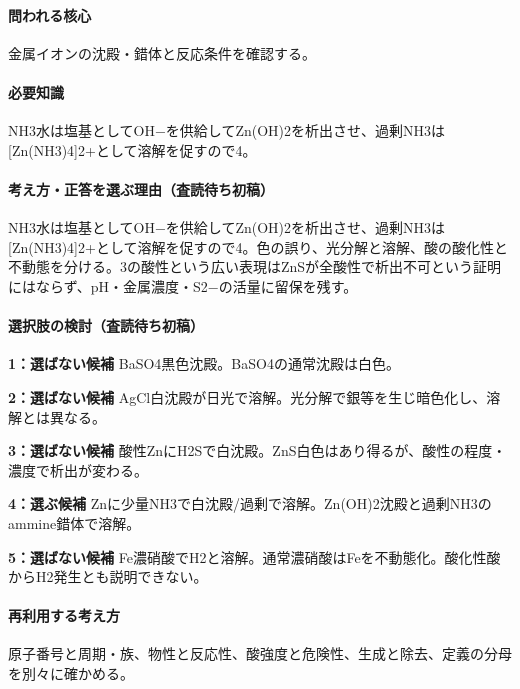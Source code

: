 \paragraph{問われる核心} 金属イオンの沈殿・錯体と反応条件を確認する。

\paragraph{必要知識} NH3水は塩基としてOH−を供給してZn(OH)2を析出させ、過剰NH3は[Zn(NH3)4]2+として溶解を促すので4。

\paragraph{考え方・正答を選ぶ理由（査読待ち初稿）} NH3水は塩基としてOH−を供給してZn(OH)2を析出させ、過剰NH3は[Zn(NH3)4]2+として溶解を促すので4。色の誤り、光分解と溶解、酸の酸化性と不動態を分ける。3の酸性という広い表現はZnSが全酸性で析出不可という証明にはならず、pH・金属濃度・S2−の活量に留保を残す。

\paragraph{選択肢の検討（査読待ち初稿）}\mbox{}\par

\noindent\textbf{1：選ばない候補} BaSO4黒色沈殿。BaSO4の通常沈殿は白色。\par

\noindent\textbf{2：選ばない候補} AgCl白沈殿が日光で溶解。光分解で銀等を生じ暗色化し、溶解とは異なる。\par

\noindent\textbf{3：選ばない候補} 酸性ZnにH2Sで白沈殿。ZnS白色はあり得るが、酸性の程度・濃度で析出が変わる。\par

\noindent\textbf{4：選ぶ候補} Znに少量NH3で白沈殿/過剰で溶解。Zn(OH)2沈殿と過剰NH3のammine錯体で溶解。\par

\noindent\textbf{5：選ばない候補} Fe濃硝酸でH2と溶解。通常濃硝酸はFeを不動態化。酸化性酸からH2発生とも説明できない。\par

\paragraph{再利用する考え方} 原子番号と周期・族、物性と反応性、酸強度と危険性、生成と除去、定義の分母を別々に確かめる。

